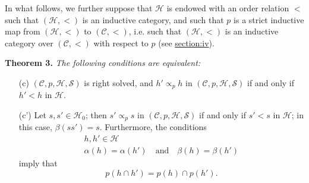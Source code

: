 \documentclass[a4paper,oneside,nobib,nofonts,notitlepage,notoc,nols,fleqn,justified]{tufte-book}
\newenvironment{itenv}[1]
  {\phantomsection\par\medskip\noindent\textbf{#1.}\itshape}
  {\par\medskip}
\newcommand{\oldpage}[1]{{\reversemarginpar\marginnote{\raggedleft\footnotesize\textit{p.~#1}}}}
\newcommand{\CC}{\mathcal{C}}
\newcommand{\HH}{\mathcal{H}}
\renewcommand{\SS}{\mathcal{S}}
\newcommand{\subs}{\mathrel{\propto}}
\begin{document}
In what follows, we further suppose that $\HH$ is endowed with an order relation $<$ such that $(\HH,<)$ is an inductive category, and such that $p$ is a strict inductive map from $(\HH,<)$ to $(\CC,<)$, i.e. such that $(\HH,<)$ is an inductive category over $(\CC,<)$ with respect to $p$ (see \hyperref[§IV]{section:iv}).

\begin{itenv}{Theorem 3}
\label{theorem:3}
  The following conditions are equivalent:
  \begin{enumerate}
    \item[\normalfont(c)]
      $(\CC,p,\HH,\SS)$ is right solved, and $h'\subs_p h$ in $(\CC,p,\HH,\SS)$ if and only if $h'<h$ in $\HH$.

    \item[\normalfont(c')]
      Let $s,s'\in\HH_0$;
      then $s'\subs_p s$ in $(\CC,p,\HH,\SS)$ if and only if $s'<s$ in $\HH$;
      in this case, $\beta(ss')=s$.
      Furthermore, the conditions
      \[
        \begin{gathered}
          h,h'\in\HH
        \\\alpha(h)=\alpha(h')
          \quad\text{and}\quad
          \beta(h)=\beta(h')
        \end{gathered}
      \]
      \oldpage{371}
      imply that
      \[
        p(h\cap h')
        = p(h)\cap p(h').
      \]
  \end{enumerate}
\end{itenv}
\end{document}
